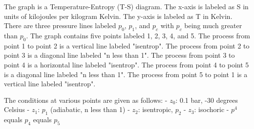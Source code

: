 The graph is a Temperature-Entropy (T-S) diagram. The x-axis is labeled as S in units of kilojoules per kilogram Kelvin. The y-axis is labeled as T in Kelvin. There are three pressure lines labeled \( p_0 \), \( p_1 \), and \( p_c \) with \( p_c \) being much greater than \( p_0 \). The graph contains five points labeled 1, 2, 3, 4, and 5. The process from point 1 to point 2 is a vertical line labeled "isentrop". The process from point 2 to point 3 is a diagonal line labeled "n less than 1". The process from point 3 to point 4 is a horizontal line labeled "isentrop". The process from point 4 to point 5 is a diagonal line labeled "n less than 1". The process from point 5 to point 1 is a vertical line labeled "isentrop".

The conditions at various points are given as follows:
- \( z_0 \): 0.1 bar, -30 degrees Celsius
- \( z_1 \): \( p_1 \) (adiabatic, n less than 1)
- \( z_2 \): isentropic, \( p_2 \)
- \( z_3 \): isochoric
- \( p^4 \) equals \( p_4 \) equals \( p_5 \)